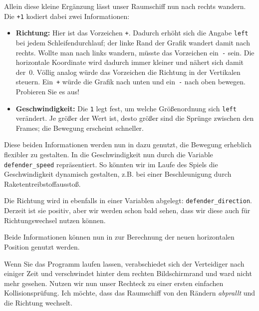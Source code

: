 Allein diese kleine Ergänzung lässt unser Raumschiff nun nach rechts wandern. Die \texttt{+1} kodiert dabei zwei Informationen: 
\begin{itemize}
	\item \textbf{Richtung:} Hier ist das Vorzeichen \texttt{+}. Dadurch erhöht sich die Angabe \texttt{left} bei jedem Schleifendurchlauf; der linke Rand der Grafik wandert damit nach rechts. Wollte man nach links wandern, müsste das Vorzeichen ein~\texttt{-} sein. Die horizontale Koordinate wird dadurch immer kleiner und nähert sich damit der~0. Völlig analog würde das Vorzeichen die Richtung in der Vertikalen steuern. Ein~\texttt{+} würde die Grafik nach unten und ein~\texttt{-} nach oben bewegen. Probieren Sie es aus!
	
	\item \textbf{Geschwindigkeit:} Die \texttt{1} legt fest, um welche Größenordnung sich \texttt{left} verändert. Je größer der Wert ist, desto größer sind die Sprünge zwischen den Frames; die Bewegung erscheint schneller. 
\end{itemize}


Diese beiden Informationen werden nun in  dazu genutzt, die Bewegung erheblich flexibler zu gestalten. In  die Geschwindigkeit nun durch die Variable \texttt{defender\_speed} repräsentiert. So könnten wir im Laufe des Spiels die Geschwindigkeit dynamisch gestalten, z.B. bei einer Beschleunigung durch Raketentreibstoffausstoß. 

Die Richtung wird in  ebenfalls in einer Variablen abgelegt: \texttt{defender\_direction}. Derzeit ist sie positiv, aber wir werden schon bald sehen, dass wir diese auch für Richtungswechsel nutzen können.

Beide Informationen können nun in  zur Berechnung der neuen horizontalen Position genutzt werden.

Wenn Sie das Programm laufen lassen, verabschiedet sich der Verteidiger nach einiger Zeit und verschwindet hinter dem rechten Bildschirmrand und ward nicht mehr gesehen. Nutzen wir nun unser Rechteck zu einer ersten einfachen Kollisionsprüfung. Ich möchte, dass das Raumschiff von den Rändern \emph{abprallt} und die Richtung wechselt. 

